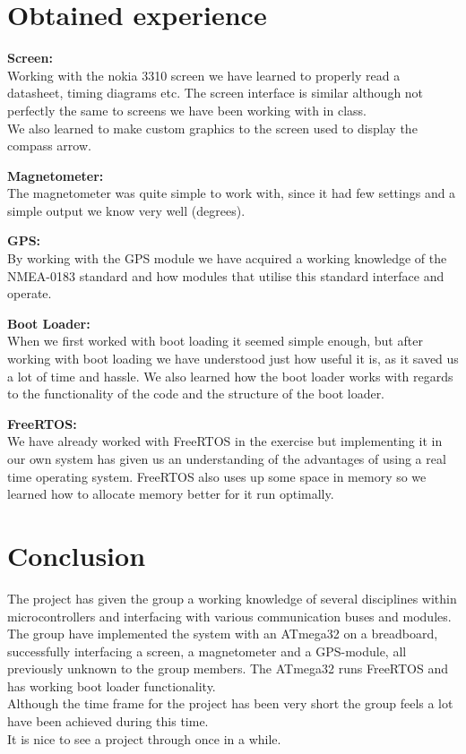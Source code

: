 \chapter{Obtained experience}
\textbf{Screen:}\\
Working with the nokia 3310 screen we have learned to properly read a datasheet, timing diagrams etc. The screen interface is similar although not perfectly the same to screens we have been working with in class.\\
We also learned to make custom graphics to the screen used to display the compass arrow.

\textbf{Magnetometer:}\\
The magnetometer was quite simple to work with, since it had few settings and a simple output we know very well (degrees).

\textbf{GPS:}\\
By working with the GPS module we have acquired a working knowledge of the NMEA-0183 standard and how modules that utilise this standard interface and operate. 

\textbf{Boot Loader:}\\
When we first worked with boot loading it seemed simple enough, but after working with boot loading we have understood just how useful it is, as it saved us a lot of time and hassle. We also learned how the boot loader works with regards to the functionality of the code and the structure of the boot loader.

\textbf{FreeRTOS:}\\
We have already worked with FreeRTOS in the exercise but implementing it in our own system has given us an understanding of the advantages of using a real time operating system. FreeRTOS also uses up some space in memory so we learned how to allocate memory better for it run optimally.


\chapter{Conclusion}
The project has given the group a working knowledge of several disciplines within microcontrollers and interfacing with various communication buses and modules.\\
The group have implemented the system with an ATmega32 on a breadboard, successfully interfacing a screen, a magnetometer and a GPS-module, all previously unknown to the group members. The ATmega32 runs FreeRTOS and has working boot loader functionality.\\
Although the time frame for the project has been very short the group feels a lot have been achieved during this time.\\
It is nice to see a project through once in a while.






